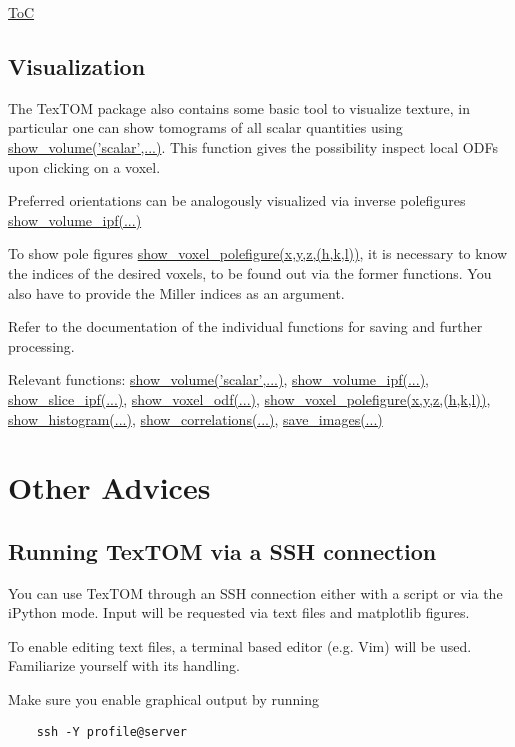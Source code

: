 \begin{flushright}
    \hyperref[toc]{ToC}
\end{flushright}

\subsection{Visualization}
The TexTOM package also contains some basic tool to visualize texture, in particular
one can show tomograms of all scalar quantities using \hyperref[fun:showvolume]{show\_volume('scalar',...)}.
This function gives the possibility inspect local ODFs upon clicking on a voxel.

Preferred orientations can be analogously visualized via inverse polefigures \hyperref[fun:showvolume]{show\_volume\_ipf(...)}

To show pole figures \hyperref[fun:showvoxelpolefigure]{show\_voxel\_polefigure(x,y,z,(h,k,l))}, it is necessary to know 
the indices of the desired voxels, to be found out via the former functions. You also have to provide the
Miller indices as an argument.

Refer to the documentation of the individual functions for saving and further processing.

Relevant functions:
\hyperref[fun:showvolume]{show\_volume('scalar',...)},
\hyperref[fun:showvolumeipf]{show\_volume\_ipf(...)},
\hyperref[fun:showsliceipf]{show\_slice\_ipf(...)},
\hyperref[fun:showvoxelodf]{show\_voxel\_odf(...)},
\hyperref[fun:showvoxelpolefigure]{show\_voxel\_polefigure(x,y,z,(h,k,l))},
\hyperref[fun:showhistogram]{show\_histogram(...)},
\hyperref[fun:showcorrelations]{show\_correlations(...)},
\hyperref[fun:saveimages]{save\_images(...)}

\section{Other Advices}
\subsection{Running TexTOM via a SSH connection}
You can use TexTOM through an SSH connection either with a script or via the iPython mode.
Input will be requested via text files and matplotlib figures.

To enable editing text files, a terminal based editor (e.g. Vim) will be used.
Familiarize yourself with its handling.

Make sure you enable graphical output by running 
\begin{verbatim}
    ssh -Y profile@server
\end{verbatim}

